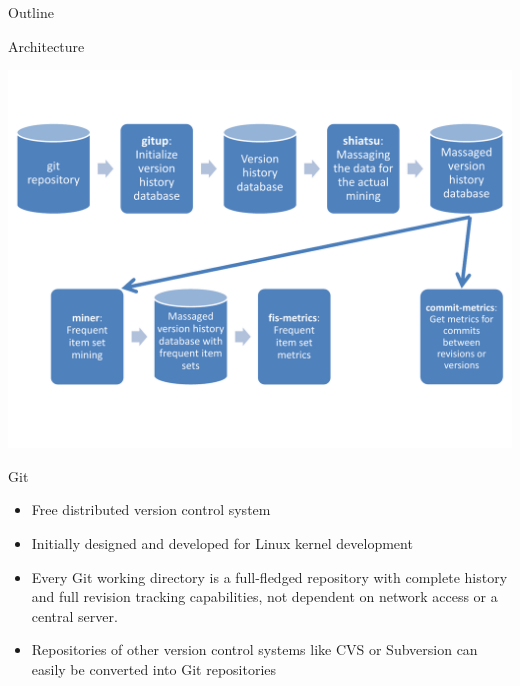 \begin{frame}{Outline}
  \tableofcontents[current]
\end{frame}


\begin{frame}{Architecture}

  \begin{center}
    \includegraphics[width=\textwidth]{figures/miner-architecture}
  \end{center}

\end{frame}


\begin{frame}{Git}
  \begin{itemize}
  \item Free distributed version control system
  \item Initially designed and developed for Linux kernel development
  \item Every Git working directory is a full-fledged repository with
    complete history and full revision tracking capabilities, not
    dependent on network access or a central server.
  \item Repositories of other version control systems like CVS or
    Subversion can easily be converted into Git repositories
  \end{itemize}
\end{frame}

